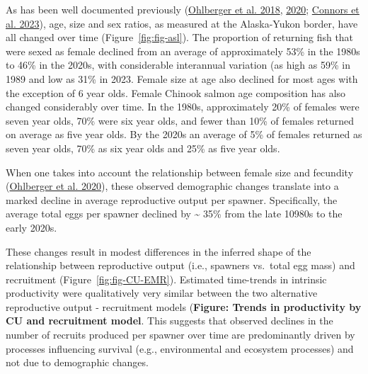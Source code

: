 \documentclass[11pt]{book}
\begin{document}
As has been well documented previously (\protect\hyperlink{ref-ohlberger_demographic_2018}{Ohlberger et al. 2018}, \protect\hyperlink{ref-ohlberger_reproductive_2020}{2020}; \protect\hyperlink{ref-connors_estimates_2023}{Connors et al. 2023}), age, size and sex ratios, as measured at the Alaska-Yukon border, have all changed over time (Figure~\ref{fig:fig-asl}). The proportion of returning fish that were sexed as female declined from an average of approximately 53\% in the 1980s to 46\% in the 2020s, with considerable interannual variation (as high as 59\% in 1989 and low as 31\% in 2023. Female size at age also declined for most ages with the exception of 6 year olds. Female Chinook salmon age composition has also changed considerably over time. In the 1980s, approximately 20\% of females were seven year olds, 70\% were six year olds, and fewer than 10\% of females returned on average as five year olds. By the 2020s an average of 5\% of females returned as seven year olds, 70\% as six year olds and 25\% as five year olds.

When one takes into account the relationship between female size and fecundity (\protect\hyperlink{ref-ohlberger_reproductive_2020}{Ohlberger et al. 2020}), these observed demographic changes translate into a marked decline in average reproductive output per spawner. Specifically, the average total eggs per spawner declined by \textasciitilde{} 35\% from the late 10980s to the early 2020s.

These changes result in modest differences in the inferred shape of the relationship between reproductive output (i.e., spawners vs.~total egg mass) and recruitment (Figure~\ref{fig:fig-CU-EMR}). Estimated time-trends in intrinsic productivity were qualitatively very similar between the two alternative reproductive output - recruitment models (\textbf{Figure: Trends in productivity by CU and recruitment model}. This suggests that observed declines in the number of recruits produced per spawner over time are predominantly driven by processes influencing survival (e.g., environmental and ecosystem processes) and not due to demographic changes.
\end{document}
